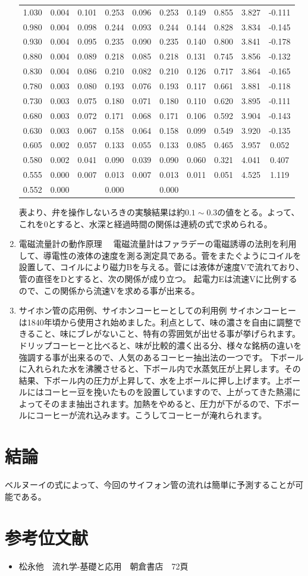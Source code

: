 \documentclass[a4j,twoside,openright,11pt]{jarticle}
\begin{document}
\begin{enumerate}
\begin{table}[htb]
\begin{center}
\begin{tabular}{|l||c|c|c|c|c|c|c|c|c|}
1.030&0.004&0.101&0.253&0.096&0.253&0.149&0.855&3.827&-0.111\\
0.980&0.004&0.098&0.244&0.093&0.244&0.144&0.828&3.834&-0.145\\
0.930&0.004&0.095&0.235&0.090&0.235&0.140&0.800&3.841&-0.178\\
0.880&0.004&0.089&0.218&0.085&0.218&0.131&0.745&3.856&-0.132\\
0.830&0.004&0.086&0.210&0.082&0.210&0.126&0.717&3.864&-0.165\\
0.780&0.003&0.080&0.193&0.076&0.193&0.117&0.661&3.881&-0.118\\
0.730&0.003&0.075&0.180&0.071&0.180&0.110&0.620&3.895&-0.111\\
0.680&0.003&0.072&0.171&0.068&0.171&0.106&0.592&3.904&-0.143\\
0.630&0.003&0.067&0.158&0.064&0.158&0.099&0.549&3.920&-0.135\\
0.605&0.002&0.057&0.133&0.055&0.133&0.085&0.465&3.957&0.052\\
0.580&0.002&0.041&0.090&0.039&0.090&0.060&0.321&4.041&0.407\\
0.555&0.000&0.007&0.013&0.007&0.013&0.011&0.051&4.525&1.119\\
0.552&0.000&&0.000&&0.000&&&&\\
\hline
  \end{tabular}
\end{center}
\end{table}
\normalsize
表より、弁を操作しないろきの実験結果は約$0.1\sim0.3$の値をとる。よって、これを0とすると、水深と経過時間の関係は連続の式で求められる。
\item 電磁流量計の動作原理
　電磁流量計はファラデーの電磁誘導の法則を利用して、導電性の液体の速度を測る測定具である。菅をまたぐようにコイルを設置して、コイルにより磁力Bを与える。菅には液体が速度Vで流れており、管の直径をDとすると、次の関係が成り立つ。
起電力Eは流速Vに比例するので、この関係から流速Vを求める事が出来る。
\item サイホン管の応用例、サイホンコーヒーとしての利用例
サイホンコーヒーは1840年頃から使用され始めました。利点として、味の濃さを自由に調整できること、味にブレがないこと、特有の雰囲気が出せる事が挙げられます。ドリップコーヒーと比べると、味が比較的濃く出る分、様々な銘柄の違いを強調する事が出来るので、人気のあるコーヒー抽出法の一つです。
下ボールに入れられた水を沸騰させると、下ボール内で水蒸気圧が上昇します。その結果、下ボール内の圧力が上昇して、水を上ボールに押し上げます。上ボールにはコーヒー豆を挽いたものを設置していますので、上がってきた熱湯によってそのまま抽出されます。加熱をやめると、圧力が下がるので、下ボールにコーヒーが流れ込みます。こうしてコーヒーが淹れられます。
\end{enumerate}
\section{結論}
ベルヌーイの式によって、今回のサイフォン管の流れは簡単に予測することが可能である。
\section{参考位文献}
\begin{itemize}
\item 松永他　流れ学-基礎と応用　朝倉書店　72頁
\end{itemize}
\end{document}
